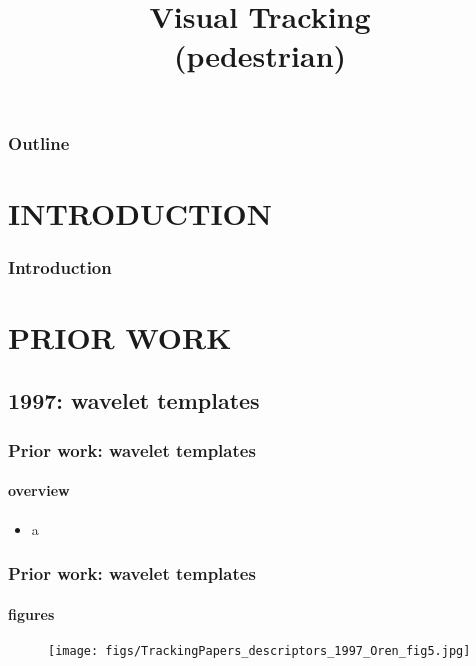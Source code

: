 
\title{Visual Tracking \\ (pedestrian)}
\begin{frame}[plain]\logoTechTower
	\titlepage
\end{frame}

\begin{frame}
\frametitle{Outline}
\logoCSIPCPL\logoTechTower
	\setcounter{tocdepth}{1}	
	\tableofcontents
\end{frame}

\section{INTRODUCTION}
\begin{frame}
\frametitle{Introduction}
\framesubtitle{}
\logoCSIPCPL\mypagenum
\end{frame}

\section{PRIOR WORK}
\subsection{1997: wavelet templates}
\begin{frame}
\frametitle{Prior work: wavelet templates}
\framesubtitle{overview}
\mypagenum
	\begin{itemize}
		\item a
	\end{itemize}
\end{frame}


\begin{frame}
\frametitle{Prior work: wavelet templates}
\framesubtitle{figures}
\mypagenum
	\begin{figure}
		\texttt{[image: figs/TrackingPapers\_descriptors\_1997\_Oren\_fig5.jpg]}
	\end{figure}
\end{frame}


